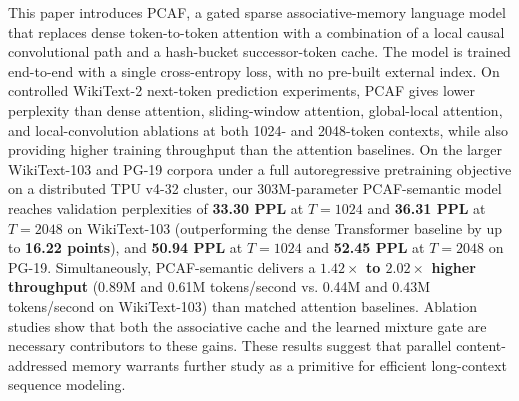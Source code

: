 \documentclass{article}
\begin{document}
This paper introduces PCAF, a gated sparse associative-memory language
model that replaces dense token-to-token attention with a combination of a
local causal convolutional path and a hash-bucket successor-token cache. The
model is trained end-to-end with a single cross-entropy loss, with no
pre-built external index. On controlled WikiText-2 next-token prediction experiments,
PCAF gives lower perplexity than dense attention, sliding-window attention,
global-local attention, and local-convolution ablations at both 1024- and
2048-token contexts, while also providing higher training throughput than the
attention baselines. On the larger WikiText-103 and PG-19
corpora under a full autoregressive pretraining objective on a distributed TPU v4-32 cluster,
our 303M-parameter PCAF-semantic model reaches validation perplexities of
\textbf{33.30 PPL} at $T=1024$ and \textbf{36.31 PPL} at $T=2048$ on WikiText-103 (outperforming the
dense Transformer baseline by up to \textbf{16.22 points}), and \textbf{50.94 PPL} at $T=1024$ and \textbf{52.45 PPL} at $T=2048$ on PG-19.
Simultaneously, PCAF-semantic delivers a \textbf{\(1.42\times\) to \(2.02\times\) higher throughput}
(0.89M and 0.61M tokens/second vs. 0.44M and 0.43M tokens/second on WikiText-103) than matched attention baselines.
Ablation studies show that both the associative cache and the learned mixture
gate are necessary contributors to these gains. These results suggest that
parallel content-addressed memory warrants further study as a primitive for
efficient long-context sequence modeling.



\end{document}
